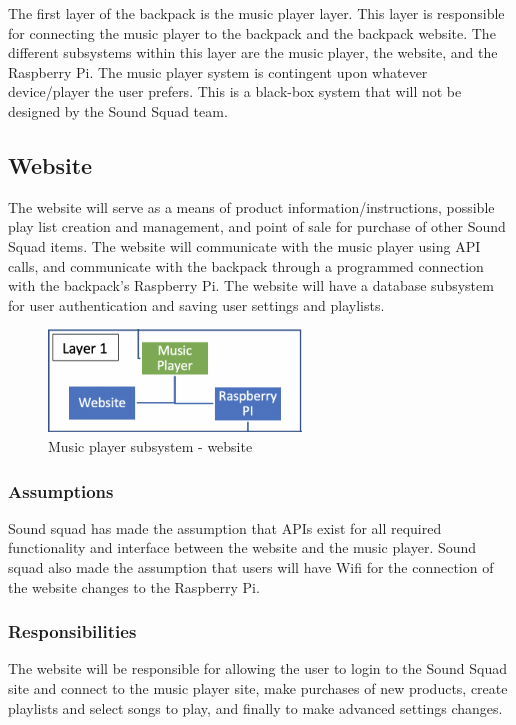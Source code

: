 The first layer of the backpack is the music player layer. This layer is responsible for connecting the music player to the backpack and the backpack website. The different subsystems within this layer are the music player, the website, and the Raspberry Pi. The music player system is contingent upon whatever device/player the user prefers. This is a black-box system that will not be designed by the Sound Squad team.

\subsection{Website}
The website will serve as a means of product information/instructions, possible play list creation and management, and point of sale for purchase of other Sound Squad items. The website will communicate with the music player using API calls, and communicate with the backpack through a programmed connection with the backpack's Raspberry Pi. The website will have a database subsystem for user authentication and saving user settings and playlists.

\begin{figure}[h!]
	\centering
 	\includegraphics[width=0.60\textwidth]{images/subsystem1}
 \caption{Music player subsystem - website}
\end{figure}

\subsubsection{Assumptions}
Sound squad has made the assumption that APIs exist for all required functionality and interface between the website and the music player. Sound squad also made the assumption that users will have Wifi for the connection of the website changes to the Raspberry Pi.

\subsubsection{Responsibilities}
The website will be responsible for allowing the user to login to the Sound Squad site and connect to the music player site, make purchases of new products, create playlists and select songs to play, and finally to make advanced settings changes.

